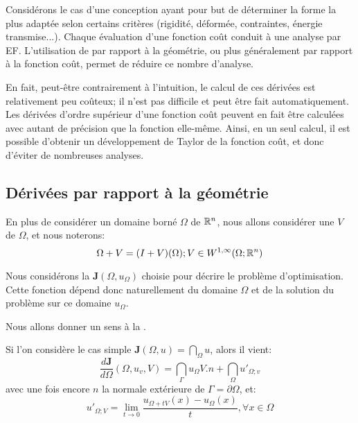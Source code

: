 
\medskip
Considérons le cas d'une conception ayant pour but de déterminer la forme la plus
adaptée selon certains critères (rigidité, déformée, contraintes, énergie
transmise...).
Chaque évaluation d'une fonction coût conduit à une analyse par EF.
L'utilisation de  par rapport à la géométrie, ou plus
généralement par rapport à la fonction coût, permet de réduire ce nombre 
d'analyse.

En fait, peut-être contrairement à l'intuition, le calcul de ces dérivées est relativement
peu coûteux; il n'est pas difficile et peut être fait automatiquement. Les dérivées
d'ordre supérieur d'une fonction coût peuvent en fait 
être calculées avec autant de précision que la fonction elle-même. Ainsi, en un seul calcul, 
il est possible d'obtenir un développement de Taylor de la fonction coût, et donc d'éviter de 
nombreuses analyses.

\medskip
\subsection{Dérivées par rapport à la géométrie}

En plus de considérer un domaine borné $\Omega$ de $\mathbb R^n$, nous allons considérer
une  $V$ de $\Omega$, et nous noterons:
\begin{equation} \Omega + V = (I+V)(\Omega); V\in W^{1,\infty}(\Omega;\mathbb R^n) \end{equation}

\medskip
Nous considérons la  ${\mathbf J}(\Omega, u_\Omega)$ choisie
pour décrire le problème d'optimisation. Cette fonction dépend donc naturellement
du domaine $\Omega$ et de la solution du problème sur ce domaine $u_\Omega$.

Nous allons donner un sens à la .

\medskip
Si l'on considère le cas simple ${\mathbf J}(\Omega,u)=\dint_\Omega u$, alors il vient:
\begin{equation}
\dfrac{d{\mathbf J}}{d\Omega}(\Omega, u_v,V)=\dint_\Gamma u_\Omega V.n + \dint_\Omega u'_{\Omega;v} 
\end{equation}
avec une fois encore $n$ la normale extérieure de $\Gamma=\partial\Omega$, et:
\begin{equation}
u'_{\Omega;V}=\lim_{t\rightarrow0} \dfrac{u_{\Omega+tV}(x)-u_\Omega(x)}t, \forall x\in\Omega
\end{equation}

